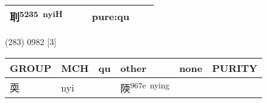 \documentclass[14pt,a4paper]{scrartcl}
\begin{document}
\begin{longtable}[c]{@{}llllll@{}}
\begin{minipage}[t]{0.14\columnwidth}\raggedright\strut
刵\textsuperscript{5235~nyiH}
\strut\end{minipage} &
\begin{minipage}[t]{0.14\columnwidth}\raggedright\strut
\strut\end{minipage} &
\begin{minipage}[t]{0.14\columnwidth}\raggedright\strut
\strut\end{minipage} &
\begin{minipage}[t]{0.14\columnwidth}\raggedright\strut
pure:qu
\strut\end{minipage}\tabularnewline
\bottomrule
\end{longtable}

(283) 0982 {[}3{]}

\begin{longtable}[c]{@{}llllll@{}}
\toprule
\begin{minipage}[b]{0.14\columnwidth}\raggedright\strut
GROUP
\strut\end{minipage} &
\begin{minipage}[b]{0.14\columnwidth}\raggedright\strut
MCH
\strut\end{minipage} &
\begin{minipage}[b]{0.14\columnwidth}\raggedright\strut
qu
\strut\end{minipage} &
\begin{minipage}[b]{0.14\columnwidth}\raggedright\strut
other
\strut\end{minipage} &
\begin{minipage}[b]{0.14\columnwidth}\raggedright\strut
none
\strut\end{minipage} &
\begin{minipage}[b]{0.14\columnwidth}\raggedright\strut
PURITY
\strut\end{minipage}\tabularnewline
\midrule
\endhead
\begin{minipage}[t]{0.14\columnwidth}\raggedright\strut
耎
\strut\end{minipage} &
\begin{minipage}[t]{0.14\columnwidth}\raggedright\strut
nyi
\strut\end{minipage} &
\begin{minipage}[t]{0.14\columnwidth}\raggedright\strut
\strut\end{minipage} &
\begin{minipage}[t]{0.14\columnwidth}\raggedright\strut
陾\textsuperscript{967e~nying}
\strut\end{minipage} &

\end{longtable}
\end{document}
